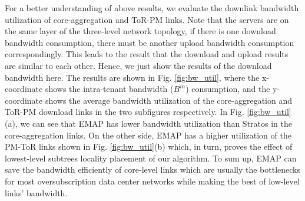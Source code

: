 \documentclass[review]{elsarticle}
\begin{document}
For a better understanding of above results, we evaluate the downlink bandwidth utilization of core-aggregation and ToR-PM links. Note that the servers are on the same layer of the three-level network topology, if there is one download bandwidth consumption, there must be another upload bandwidth consumption correspondingly. This leads to the result that the download and upload results are similar to each other. Hence, we just show the results of the download bandwidth here. The results are shown in Fig. \ref{fig:bw_util}, where the x-coordinate shows the intra-tenant bandwidth ($B^{in}$) consumption, and the y-coordinate shows the average bandwidth utilization of the core-aggregation and ToR-PM download links in the two subfigures respectively. In Fig. \ref{fig:bw_util}(a), we can see that EMAP has lower bandwidth utilization than Stratos in the core-aggregation links. On the other side, EMAP has a higher utilization of the PM-ToR links shown in Fig. \ref{fig:bw_util}(b) which, in turn, proves the effect of lowest-level subtrees locality placement of our algorithm. To sum up, EMAP can save the bandwidth efficiently of core-level links which are usually the bottlenecks for most oversubscription data center networks while making the best of low-level links’ bandwidth. 
\end{document}
